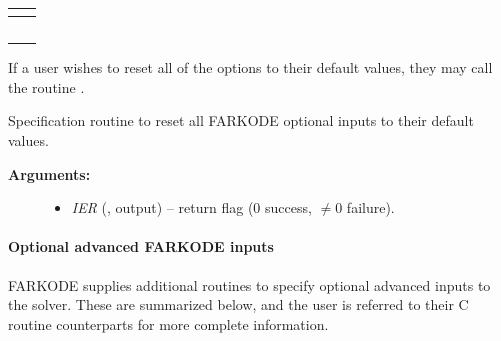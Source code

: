 \documentclass[letterpaper,10pt,english]{sphinxmanual}
\begin{document}
\begin{tabulary}{\linewidth}{|L|L|}
 & 
{\hyperref[c_interface/User_callable:ARKodeSetMaxEFailGrowth]{}}
\\\hline

 & 
{\hyperref[c_interface/User_callable:ARKodeSetMaxCFailGrowth]{}}
\\\hline

 & 
{\hyperref[c_interface/User_callable:ARKodeSetNonlinCRDown]{}}
\\\hline

 & 
{\hyperref[c_interface/User_callable:ARKodeSetNonlinRDiv]{}}
\\\hline

 & 
{\hyperref[c_interface/User_callable:ARKodeSetDeltaGammaMax]{}}
\\\hline

 & 
{\hyperref[c_interface/User_callable:ARKodeSetFixedStep]{}}
\\\hline
\end{tabulary}


If a user wishes to reset all of the options to their default values,
they may call the routine {\hyperref[f_interface/Usage:f/_/FARKSETDEFAULTS]{}}.

\begin{fulllineitems}
\label{f_interface/Usage:f/_/FARKSETDEFAULTS}
Specification routine to reset all FARKODE optional
inputs to their default values.
\begin{description}
\item[{\textbf{Arguments:}}] \leavevmode\begin{itemize}
\item {} 
\emph{IER} (, output) -- return flag (0 success, $\ne 0$ failure).

\end{itemize}

\end{description}

\end{fulllineitems}



\paragraph{Optional advanced FARKODE inputs}
\label{f_interface/Usage:optional-advanced-farkode-inputs}
FARKODE supplies additional routines to specify optional advanced
inputs to the {\hyperref[c_interface/User_callable:ARKode]{}} solver.  These are summarized below,
and the user is referred to their C routine counterparts for more
complete information.
\end{document}
